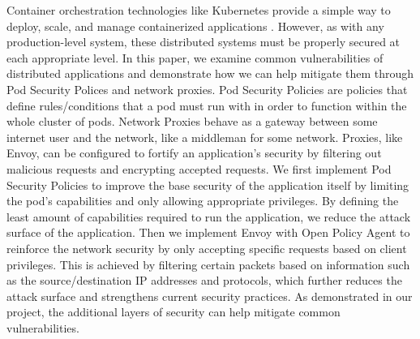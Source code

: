 
Container orchestration technologies like Kubernetes provide a simple way to deploy, scale, 
and manage containerized applications \cite{k8s}. However, as with any production-level 
system, these distributed systems must be properly secured at each appropriate level. In 
this paper, we examine common vulnerabilities of distributed applications and demonstrate 
how we can help mitigate them through Pod Security Polices and network proxies. Pod Security 
Policies are policies that define rules/conditions that a pod must run with in order to 
function within the whole cluster of pods. Network Proxies behave as a gateway between some 
internet user and the network, like a middleman for some network. Proxies, like Envoy, can 
be configured to fortify an application's security by filtering out malicious requests and 
encrypting accepted requests. We first implement Pod Security Policies to improve the base 
security of the application itself by limiting the pod's capabilities and only allowing 
appropriate privileges. By defining the least amount of capabilities required to run the 
application, we reduce the attack surface of the application. Then we implement Envoy with 
Open Policy Agent to reinforce the network security by only accepting specific requests based 
on client privileges. This is achieved by filtering certain packets based on information such 
as the source/destination IP addresses and protocols, which further reduces the attack surface 
and strengthens current security practices. As demonstrated in our project, the additional 
layers of security can help mitigate common vulnerabilities.
